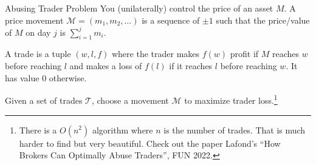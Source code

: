 \documentclass[aspectratio=169,11pt]{beamer}
\newcommand{\blankslides}{%
  \begin{frame}[plain]\end{frame}%
  \begin{frame}[plain]\end{frame}%
}
\begin{document}
\begin{frame}{Abusing Trader Problem}
You (unilaterally) control the price of an asset $M$. A price movement $\mathcal{M}=(m_1,m_2,\dots)$ is a
sequence of $\pm1$ such that the price/value of $M$ on day $j$ is $\sum_{i=1}^{j} m_i$.

\medskip
A trade is a tuple $(w,l,f)$ where the trader makes $f(w)$ profit if $M$ reaches $w$ before reaching $l$
and makes a loss of $f(l)$ if it reaches $l$ before reaching $w$. It has value $0$ otherwise.

\medskip
Given a set of trades $\mathcal{T}$, choose a movement $\mathcal{M}$ to maximize trader loss.\footnote{There is a
$O(n^2)$ algorithm where $n$ is the number of trades. That is much harder to find but very beautiful.
Check out the paper Lafond's ``How Brokers Can Optimally Abuse Traders'', FUN 2022.}
\end{frame}
\blankslides
\end{document}

